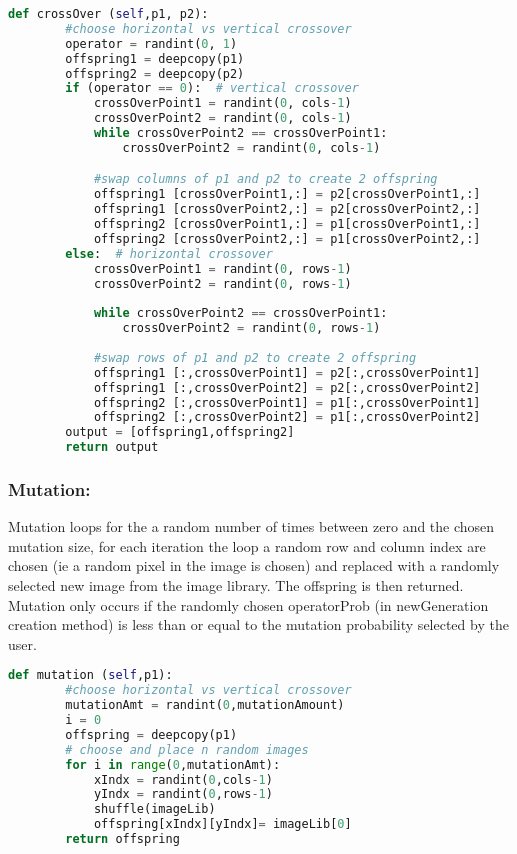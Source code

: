 \documentclass{article}
\begin{document}
\begin{lstlisting}[language=Python]
def crossOver (self,p1, p2):
        #choose horizontal vs vertical crossover
        operator = randint(0, 1)
        offspring1 = deepcopy(p1)
        offspring2 = deepcopy(p2)
        if (operator == 0):  # vertical crossover
            crossOverPoint1 = randint(0, cols-1)
            crossOverPoint2 = randint(0, cols-1)
            while crossOverPoint2 == crossOverPoint1:
                crossOverPoint2 = randint(0, cols-1)

            #swap columns of p1 and p2 to create 2 offspring 
            offspring1 [crossOverPoint1,:] = p2[crossOverPoint1,:]
            offspring1 [crossOverPoint2,:] = p2[crossOverPoint2,:]
            offspring2 [crossOverPoint1,:] = p1[crossOverPoint1,:]
            offspring2 [crossOverPoint2,:] = p1[crossOverPoint2,:]
        else:  # horizontal crossover
            crossOverPoint1 = randint(0, rows-1)
            crossOverPoint2 = randint(0, rows-1)
            
            while crossOverPoint2 == crossOverPoint1:
                crossOverPoint2 = randint(0, rows-1)
            
            #swap rows of p1 and p2 to create 2 offspring 
            offspring1 [:,crossOverPoint1] = p2[:,crossOverPoint1]
            offspring1 [:,crossOverPoint2] = p2[:,crossOverPoint2]
            offspring2 [:,crossOverPoint1] = p1[:,crossOverPoint1]
            offspring2 [:,crossOverPoint2] = p1[:,crossOverPoint2]
        output = [offspring1,offspring2]
        return output
\end{lstlisting}

\subsubsection*{Mutation:}
Mutation loops for the a random number of times between zero and the chosen mutation size, for each iteration the loop a random row and column index are chosen (ie a random pixel in the image is chosen) and replaced with a randomly selected new image from the image library. The offspring is then returned. Mutation only occurs if the randomly chosen operatorProb (in newGeneration creation method) is less than or equal to the mutation probability selected by the user.\\


\begin{lstlisting}[language=Python]
def mutation (self,p1):
        #choose horizontal vs vertical crossover
        mutationAmt = randint(0,mutationAmount)
        i = 0
        offspring = deepcopy(p1)
        # choose and place n random images 
        for i in range(0,mutationAmt):
            xIndx = randint(0,cols-1)
            yIndx = randint(0,rows-1)
            shuffle(imageLib)
            offspring[xIndx][yIndx]= imageLib[0]
        return offspring
\end{lstlisting}
\end{document}
